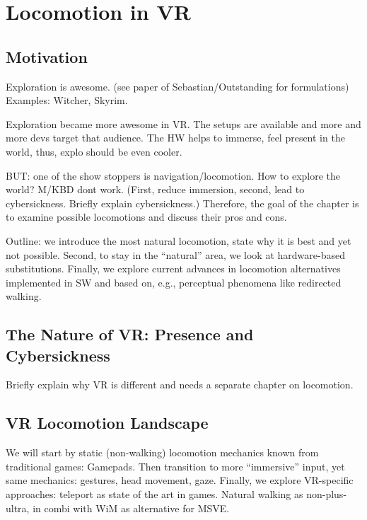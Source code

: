 \chapter{Locomotion in VR}
\label{sec:locomotion}






\section{Motivation}

Exploration is awesome. (see paper of Sebastian/Outstanding for formulations)
Examples: Witcher, Skyrim.

Exploration became more awesome in VR. The setups are available and more and more devs target that audience. The HW helps to immerse, feel present in the world, thus, explo should be even cooler.

BUT: one of the show stoppers is navigation/locomotion. How to explore the world? M/KBD dont work. (First, reduce immersion, second, lead to cybersickness. Briefly explain cybersickness.)
Therefore, the goal of the chapter is to examine possible locomotions and discuss their pros and cons.

Outline: we introduce the most natural locomotion, state why it is best and yet not possible. Second, to stay in the “natural” area, we look at hardware-based substitutions. Finally, we explore current advances in locomotion alternatives implemented in SW and based on, e.g., perceptual phenomena like redirected walking.


\section{The Nature of VR: Presence and Cybersickness}

Briefly explain why VR is different and needs a separate chapter on locomotion.





\section{VR Locomotion Landscape}

We will start by static (non-walking) locomotion mechanics known from traditional games: Gamepads. Then transition to more “immersive” input, yet same mechanics: gestures, head movement, gaze. Finally, we explore VR-specific approaches: teleport as state of the art in games. Natural walking as non-plus-ultra, in combi with WiM as alternative for MSVE.




